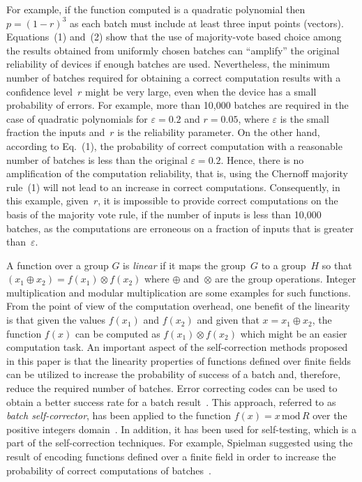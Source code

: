 \begin{multicols}{2}
   For example, if the function computed is a quadratic polynomial then 
   $p=(1-r)^3$ as each batch 
must include at least three input points (vectors). Equations~(1) and~(2) show that the use of majority-vote based choice 
among the results obtained from uniformly chosen batches can ``amplify'' the original reliability of devices if  
enough batches are used. Nevertheless, the minimum number of batches required for obtaining a correct computation results with 
a confidence level~$r$ might be very large, even when the device has a small probability of errors. For example, more than 
10,000 batches are required in the case of quadratic polynomials for $\varepsilon=0.2$ and $r=0.05$, where 
$\varepsilon$ is the small fraction the inputs and~$r$  is the reliability parameter. On the other hand, according to Eq.~(1), the 
probability of correct computation with a reasonable number of batches is less than the original $\varepsilon =0.2$. 
Hence, there is no amplification of the computation reliability, that is, 
using the Chernoff majority rule~(1) will not lead 
to an increase in correct computations. Consequently, in this example,
given~$r$, it is impossible to provide correct 
computations on the basis of the majority vote rule, if the number of inputs is less than 10,000 batches, as the 
computations are erroneous on a fraction of inputs that is greater than~$\varepsilon$.                               
    
    A function over a group $G$ is \textit{linear} if it maps the group~$G$ to a 
    group~$H$ so that $(x_1\oplus 
x_2)=f(x_1)\otimes f(x_2)$ where $\oplus$ and~$\otimes$ are the
group operations. Integer multiplication and modular 
multiplication are some examples for such functions. 
From the point of view of the computation overhead, one benefit of 
the linearity is that given the values $f(x_1)$ and $f(x_2)$ and given that $x=x_1\oplus x_2$, the function $f(x)$ can be 
computed as $f(x_1)\otimes f(x_2)$ which might be an easier computation task. An important aspect of the 
self-correction methods proposed in this paper is that the linearity properties of functions 
defined over finite fields can be 
utilized to increase the probability of success of a batch and, therefore, 
reduce the required number of batches. Error 
correcting codes can be used to obtain a better success rate for a batch result~\cite{6-dol}. This approach, referred to as 
\textit{batch self-corrector}, has been applied to the function $f(x)=x\,\mathrm{mod}\, R$ over the positive integers 
domain~\cite{6-dol}. In addition, it has been used for self-testing, which is a part of the self-correction techniques. For 
example, Spielman suggested using the result of encoding functions defined over a finite field in order to 
increase the probability of correct computations of batches~\cite{7-dol}. 
    

\end{multicols}
